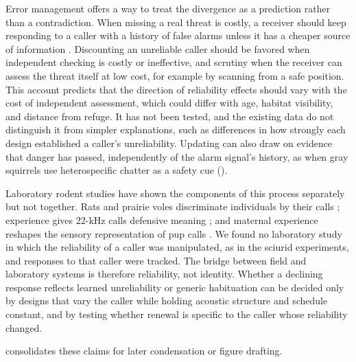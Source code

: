 Error management offers a way to treat the divergence as a prediction rather than a contradiction.
When missing a real threat is costly, a receiver should keep responding to a caller with a history of false alarms unless it has a cheaper source of information \citep{Nesse2005}. Discounting an unreliable caller should be favored when independent checking is costly or ineffective, and scrutiny when the receiver can assess the threat itself at low cost, for example by scanning from a safe position. This account predicts that the direction of reliability effects should vary with the cost of independent assessment, which could differ with age, habitat visibility, and distance from refuge. It has not been tested, and the existing data do not distinguish it from simpler explanations, such as differences in how strongly each design established a caller's unreliability.
Updating can also draw on evidence that danger has passed, independently of the alarm signal's history, as when gray squirrels use heterospecific chatter as a safety cue \citep{LillyEtAl2019} ().

Laboratory rodent studies have shown the components of this process separately but not together. Rats and prairie voles discriminate individuals by their calls \citep{VielleEtAl2021,WarrenEtAl2025}; experience gives 22-kHz calls defensive meaning \citep{KimEtAl2010,CalubEtAl2018}; and maternal experience reshapes the sensory representation of pup calls \citep{SchiavoEtAl2020}. We found no laboratory study in which the reliability of a caller was manipulated, as in the sciurid experiments, and responses to that caller were tracked. The bridge between field and laboratory systems is therefore reliability, not identity. Whether a declining response reflects learned unreliability or generic habituation can be decided only by designs that vary the caller while holding acoustic structure and schedule constant, and by testing whether renewal is specific to the caller whose reliability changed.

 consolidates these claims for later condensation or figure drafting.


